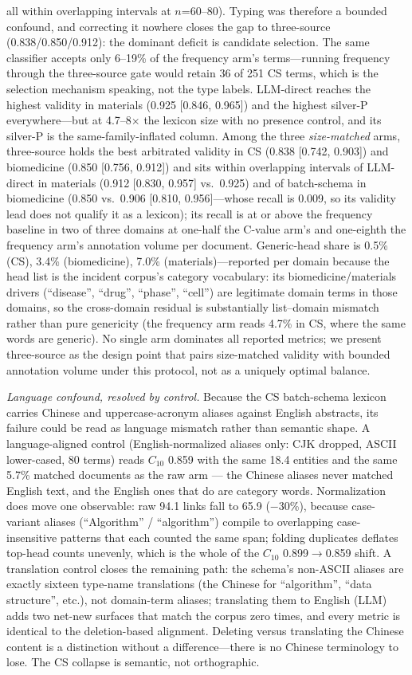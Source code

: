 \documentclass[preprint,12pt]{elsarticle}
\begin{document}
all within overlapping intervals at $n$=60--80). Typing was therefore
a bounded confound, and correcting it nowhere closes the gap to
three-source (0.838/0.850/0.912): the dominant deficit is candidate
selection. The same classifier accepts only 6--19\% of the frequency
arm's terms---running frequency through the three-source gate would
retain 36 of 251 CS terms, which is the selection mechanism speaking,
not the type labels.
LLM-direct reaches the highest validity in materials (0.925 [0.846,
0.965]) and the
highest silver-P everywhere---but at 4.7--8$\times$ the lexicon size
with no presence control, and its silver-P is the same-family-inflated
column. Among the three \emph{size-matched} arms, three-source holds
the best arbitrated validity in CS (0.838 [0.742, 0.903]) and
biomedicine (0.850 [0.756, 0.912]) and sits within overlapping
intervals of LLM-direct in materials (0.912 [0.830, 0.957] vs.\ 0.925)
and of batch-schema in biomedicine (0.850 vs.\ 0.906 [0.810,
0.956]---whose recall is 0.009, so its validity lead does not qualify
it as a lexicon); its recall is at or above the frequency baseline in
two of three domains at one-half the C-value arm's and one-eighth the
frequency arm's annotation volume per document. Generic-head share is
0.5\% (CS), 3.4\% (biomedicine), 7.0\% (materials)---reported per
domain because the head list is the incident corpus's category
vocabulary: its biomedicine/materials drivers (``disease'', ``drug'',
``phase'', ``cell'') are legitimate domain terms in those domains, so
the cross-domain residual is substantially list--domain mismatch
rather than pure genericity (the frequency arm reads 4.7\% in CS,
where the same words are generic). No single arm dominates all
reported metrics; we present three-source as the design point that
pairs size-matched validity with bounded annotation volume under this
protocol, not as a uniquely optimal balance.

\emph{Language confound, resolved by control.} Because the CS
batch-schema lexicon carries Chinese and uppercase-acronym aliases
against English abstracts, its failure could be read as language
mismatch rather than semantic shape. A language-aligned control
(English-normalized aliases only: CJK dropped, ASCII lower-cased, 80
terms) reads $C_{10}$ 0.859 with the same 18.4 entities and the same
5.7\% matched documents as the raw arm --- the Chinese aliases never
matched English text, and the English ones that do are category
words. Normalization does move one observable: raw 94.1 links fall to
65.9 ($-$30\%), because case-variant aliases (``Algorithm'' /
``algorithm'') compile to overlapping case-insensitive patterns that
each counted the same span; folding duplicates deflates top-head
counts unevenly, which is the whole of the $C_{10}$ 0.899$\to$0.859
shift. A translation control closes the remaining path: the schema's
non-ASCII aliases are exactly sixteen type-name translations (the
Chinese for ``algorithm'', ``data structure'', etc.), not domain-term
aliases; translating them to English (LLM) adds two net-new surfaces
that match the corpus zero times, and every metric is identical to the
deletion-based alignment. Deleting versus translating the Chinese
content is a distinction without a difference---there is no Chinese
terminology to lose. The CS collapse is semantic, not orthographic.
\end{document}
